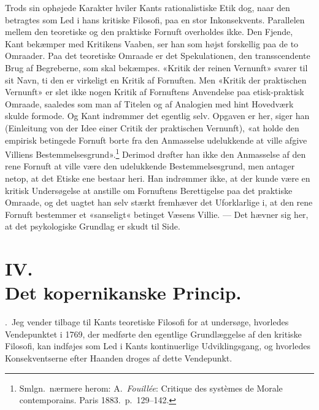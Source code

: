 \documentclass[12pt,a4paper]{article}
\newcommand{\apage}[1]{\marginnote{\footnotesize\textit{[#1]}}}
\begin{document}
Trods sin ophøjede Karakter hviler Kants rationalistiske Etik dog, naar
den betragtes som Led i hans kritiske Filosofi, paa en stor Inkonsekvents.
Parallelen mellem den teoretiske og den praktiske Fornuft overholdes
ikke. Den Fjende, Kant bekæmper med Kritikens Vaaben, ser han som højst
forskellig paa de to Omraader. Paa det teoretiske Omraade er det
Spekulationen, den transscendente Brug af Begreberne, som skal bekæmpes.
«Kritik der reinen Vernunft» svarer til sit Navn, ti den er virkeligt en
Kritik af Fornuften. Men «Kritik der praktischen Vernunft» er slet ikke
nogen Kritik af Fornuftens Anvendelse paa etisk-praktisk Omraade,
saaledes som man af Titelen og af Analogien med hint Hovedværk skulde
formode. Og Kant indrømmer det egentlig selv. Opgaven er her, siger han
(Einleitung von der Idee einer Critik der praktischen Vernunft), «at
holde den empirisk betingede Fornuft borte fra den Anmasselse udelukkende
at ville afgive Villiens Bestemmelsesgrund».\footnote{Smlgn.\ nærmere
herom: A.\ \emph{Fouillée}: Critique des systèmes de Morale
contemporains. Paris 1883.\ p.\ 129--142.} Derimod drøfter han ikke den
Anmasselse af den rene Fornuft at ville være den udelukkende
Bestemmelsesgrund, men antager netop, at det Etiske ene bestaar heri. Han
indrømmer ikke, at der kunde være en kritisk Undersøgelse at anstille om
Fornuftens Berettigelse paa det praktiske Omraade, og det uagtet han selv
stærkt fremhæver det Uforklarlige i, at den rene Fornuft bestemmer et
«sanseligt« betinget Væsens Villie. --- Det hævner sig her, at det
psykologiske Grundlag er skudt til Side.

\section*{IV.\\ Det kopernikanske Princip.}

\apage{47} .\ Jeg vender tilbage til Kants teoretiske Filosofi for at
undersøge, hvorledes Vendepunktet i 1769, der medførte den egentlige
Grundlæggelse af den kritiske Filosofi, kan indføjes som Led i Kants
kontinuerlige Udviklingsgang, og hvorledes Konsekventserne efter Haanden
droges af dette Vendepunkt.
\end{document}
